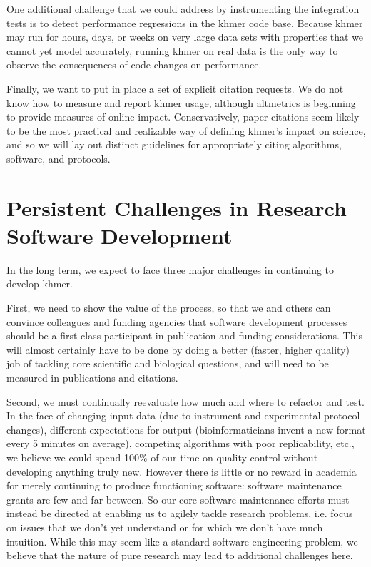 \documentclass[11pt]{article}
\begin{document}
One additional challenge that we could address by instrumenting the
integration tests is to detect performance regressions in the khmer
code base.  Because khmer may run for hours, days, or weeks on very
large data sets with properties that we cannot yet model accurately,
running khmer on real data is the only way to observe the consequences
of code changes on performance.

Finally, we want to put in place a set of explicit citation requests.
We do not know how to measure and report khmer usage, although
altmetrics is beginning to provide measures of online impact.
Conservatively, paper citations seem likely to be the most practical
and realizable way of defining khmer's impact on science, and so we
will lay out distinct guidelines for appropriately citing algorithms,
software, and protocols.

\section{Persistent Challenges in Research Software Development}

In the long term, we expect to face three major challenges in continuing
to develop khmer.

First, we need to show the value of the process, so that we and others
can convince colleagues and funding agencies that software development
processes should be a first-class participant in publication and
funding considerations.  This will almost certainly have to be done
by doing a better (faster, higher quality) job of tackling core
scientific and biological questions, and will need to be measured
in publications and citations.

Second, we must continually reevaluate how much and where to refactor
and test.  In the face of changing input data (due to instrument and
experimental protocol changes), different expectations for output
(bioinformaticians invent a new format every 5 minutes on average),
competing algorithms with poor replicability, etc., we believe we
could spend 100\% of our time on quality control without developing
anything truly new.  However there is little or no reward in academia
for merely continuing to produce functioning software: software
maintenance grants are few and far between.  So our core software
maintenance efforts must instead be directed at enabling us to agilely
tackle research problems, i.e. focus on issues that we don't yet
understand or for which we don't have much intuition.  While this may
seem like a standard software engineering problem, we believe that
the nature of pure research may lead to additional challenges here.
\end{document}
